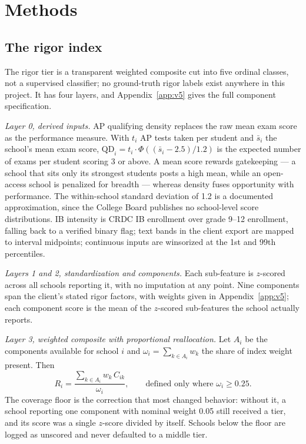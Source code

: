 \documentclass[12pt]{article}
\begin{document}
\section{Methods}
\label{sec:methods}

\subsection{The rigor index}
\label{sec:methods-rigor}

The rigor tier is a transparent weighted composite cut into five ordinal classes, not a supervised classifier; no ground-truth rigor labels exist anywhere in this project. It has four layers, and Appendix~\ref{app:v5} gives the full component specification.

\emph{Layer 0, derived inputs.} AP qualifying density replaces the raw mean exam score as the performance measure. With $t_i$ AP tests taken per student and $\bar{s}_i$ the school's mean exam score, $\mathrm{QD}_i = t_i \cdot \Phi((\bar{s}_i - 2.5)/1.2)$ is the expected number of exams per student scoring 3 or above. A mean score rewards gatekeeping --- a school that sits only its strongest students posts a high mean, while an open-access school is penalized for breadth --- whereas density fuses opportunity with performance. The within-school standard deviation of 1.2 is a documented approximation, since the College Board publishes no school-level score distributions. IB intensity is CRDC IB enrollment over grade 9--12 enrollment, falling back to a verified binary flag; text bands in the client export are mapped to interval midpoints; continuous inputs are winsorized at the 1st and 99th percentiles.

\emph{Layers 1 and 2, standardization and components.} Each sub-feature is $z$-scored across all schools reporting it, with no imputation at any point. Nine components span the client's stated rigor factors, with weights given in Appendix~\ref{app:v5}; each component score is the mean of the $z$-scored sub-features the school actually reports.

\emph{Layer 3, weighted composite with proportional reallocation.} Let $A_i$ be the components available for school $i$ and $\omega_i = \sum_{k \in A_i} w_k$ the share of index weight present. Then
\[
R_i = \frac{\sum_{k \in A_i} w_k\, C_{ik}}{\omega_i}, \qquad \text{defined only where } \omega_i \geq 0.25 .
\]
The coverage floor is the correction that most changed behavior: without it, a school reporting one component with nominal weight 0.05 still received a tier, and its score was a single $z$-score divided by itself. Schools below the floor are logged as unscored and never defaulted to a middle tier.
\end{document}
